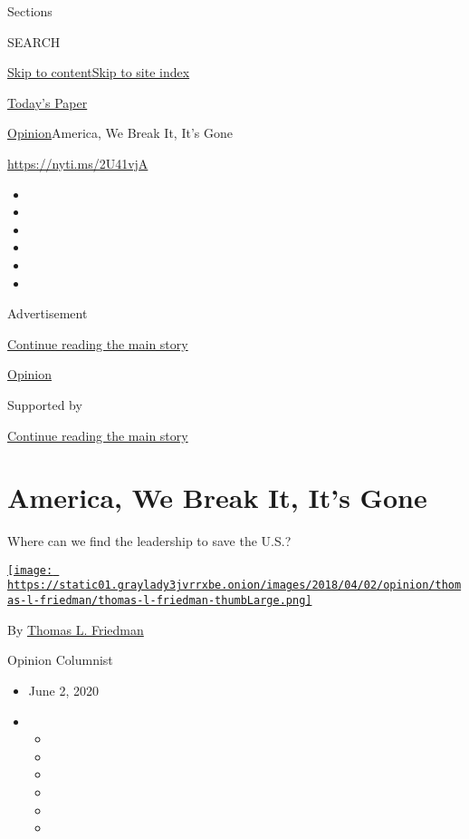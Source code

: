 Sections

SEARCH

\protect\hyperlink{site-content}{Skip to
content}\protect\hyperlink{site-index}{Skip to site index}

\href{https://myaccount.nytimes3xbfgragh.onion/auth/login?response_type=cookie\&client_id=vi}{}

\href{https://www.nytimes3xbfgragh.onion/section/todayspaper}{Today's
Paper}

\href{/section/opinion}{Opinion}\textbar{}America, We Break It, It's
Gone

\url{https://nyti.ms/2U41vjA}

\begin{itemize}
\item
\item
\item
\item
\item
\item
\end{itemize}

Advertisement

\protect\hyperlink{after-top}{Continue reading the main story}

\href{/section/opinion}{Opinion}

Supported by

\protect\hyperlink{after-sponsor}{Continue reading the main story}

\hypertarget{america-we-break-it-its-gone}{%
\section{America, We Break It, It's
Gone}\label{america-we-break-it-its-gone}}

Where can we find the leadership to save the U.S.?

\href{https://www.nytimes3xbfgragh.onion/by/thomas-l-friedman}{\texttt{[image: https://static01.graylady3jvrrxbe.onion/images/2018/04/02/opinion/thomas-l-friedman/thomas-l-friedman-thumbLarge.png]}}

By \href{https://www.nytimes3xbfgragh.onion/by/thomas-l-friedman}{Thomas
L. Friedman}

Opinion Columnist

\begin{itemize}
\item
  June 2, 2020
\item
  \begin{itemize}
  \item
  \item
  \item
  \item
  \item
  \item
  \end{itemize}
\end{itemize}

